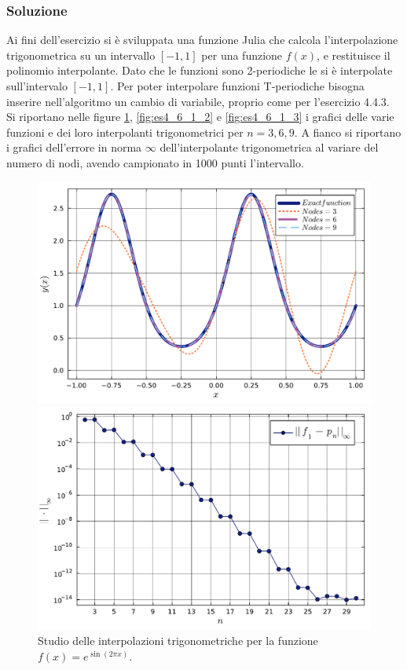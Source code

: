 \documentclass[letterpaper, 12pt]{article}
\numberwithin{equation}{section}    %
\begin{document}
\subsubsection{Soluzione}
Ai fini dell'esercizio si è sviluppata una funzione Julia che calcola l'interpolazione trigonometrica
su un intervallo $[-1, 1]$ per una funzione $f(x)$, e restituisce il polinomio interpolante. Dato che le funzioni
sono 2-periodiche le si è interpolate sull'intervalo $[-1, 1]$. Per poter interpolare funzioni 
T-periodiche bisogna inserire nell'algoritmo un cambio di variabile, proprio come per l'esercizio 4.4.3. \\
Si riportano nelle figure \ref{fig:es4_6_1_1}, \ref{fig:es4_6_1_2} e \ref{fig:es4_6_1_3} i grafici 
delle varie funzioni 
e dei loro interpolanti trigonometrici per $n=3,6,9$. A fianco si riportano i grafici 
dell'errore in norma $\infty$ dell'interpolante trigonometrica al variare del numero di nodi, avendo campionato 
in 1000 punti l'intervallo.
\begin{figure}[!ht]
    \centering
    \begin{minipage}[b]{0.40\textwidth}
        \includegraphics[width=\textwidth]{4611.pdf}
    \end{minipage}
    \hspace{0.5cm}
    \begin{minipage}[b]{0.40\textwidth}
        \includegraphics[width=\textwidth]{4612.pdf}
    \end{minipage}
    \caption{Studio delle interpolazioni trigonometriche per la funzione $f(x) = e^{\sin (2\pi x)}$.}
    \label{fig:es4_6_1_1}
\end{figure}
\end{document}
